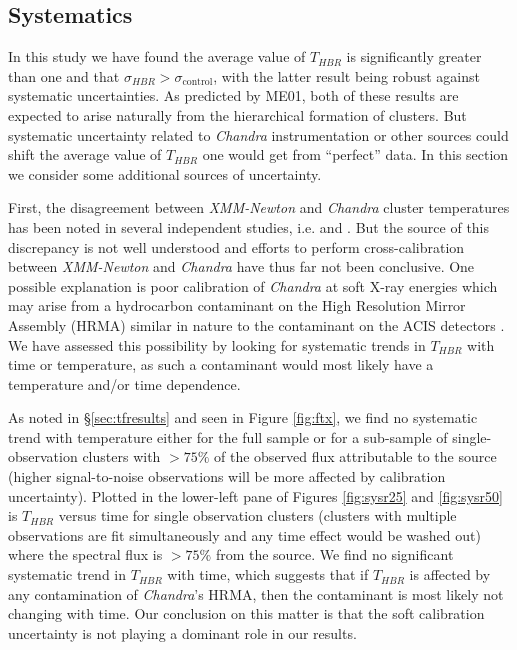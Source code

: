 \documentclass[apj]{emulateapj}
\begin{document}
\subsection{Systematics} \label{sec:sys}

In this study we have found the average value of $T_{HBR}$ is significantly
greater than one and that $\sigma_{HBR} > \sigma_{\mathrm{control}}$, with the
latter result being robust against systematic uncertainties. As
predicted by ME01, both of these results are expected to arise
naturally from the hierarchical formation of clusters. But systematic
uncertainty related to {\it Chandra} instrumentation or other sources could
shift the average value of $T_{HBR}$ one would get from ``perfect'' data. In
this section we consider some additional sources of uncertainty.

First, the disagreement between {\it XMM-Newton} and {\it Chandra}
cluster temperatures has been noted in several independent studies,
i.e. \cite{2005ApJ...628..655V} and \cite{chanxmmdis}. But the source of this
discrepancy is not well understood and efforts to perform
cross-calibration between {\it XMM-Newton} and {\it Chandra} have thus
far not been conclusive. One possible explanation is poor calibration
of {\it Chandra} at soft X-ray energies which may arise from a
hydrocarbon contaminant on the High Resolution Mirror Assembly (HRMA)
similar in nature to the contaminant on the ACIS detectors
\citep{aciscontaminant}. We have assessed this possibility by looking
for systematic trends in $T_{HBR}$ with time or temperature, as such a
contaminant would most likely have a temperature and/or time
dependence.

As noted in \S\ref{sec:tfresults} and seen in Figure \ref{fig:ftx}, we
find no systematic trend with temperature either for the full sample
or for a sub-sample of single-observation clusters with $> 75\%$ of
the observed flux attributable to the source (higher signal-to-noise
observations will be more affected by calibration
uncertainty). Plotted in the lower-left pane of Figures
\ref{fig:sysr25} and \ref{fig:sysr50} is $T_{HBR}$ versus time for
single observation clusters (clusters with multiple observations are
fit simultaneously and any time effect would be washed out) where
the spectral flux is $> 75\%$ from the source. We find no significant
systematic trend in $T_{HBR}$ with time, which suggests that if
$T_{HBR}$ is affected by any contamination of {\it Chandra}'s HRMA,
then the contaminant is most likely not changing with time. Our
conclusion on this matter is that the soft calibration uncertainty is
not playing a dominant role in our results.
\end{document}
